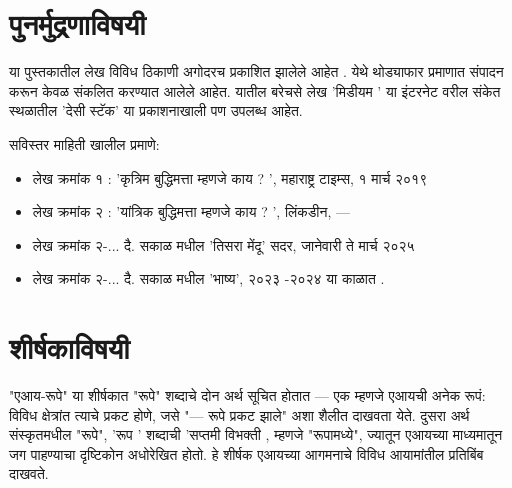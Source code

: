\chapter*{पुनर्मुद्रणाविषयी}

या पुस्तकातील लेख विविध ठिकाणी अगोदरच प्रकाशित झालेले आहेत .  येथे थोड्याफार प्रमाणात संपादन करून केवळ संकलित करण्यात आलेले आहेत.  यातील बरेचसे लेख 'मिडीयम '  या इंटरनेट वरील संकेत स्थळातील 'देसी स्टॅक' या प्रकाशनाखाली पण उपलब्ध आहेत. 

सविस्तर माहिती खालील प्रमाणे:
\begin{itemize}
	\item लेख क्रमांक १ : 'कृत्रिम बुद्धिमत्ता म्हणजे काय ? ', महाराष्ट्र टाइम्स, १  मार्च २०१९
	\item  लेख क्रमांक २  : 'यांत्रिक बुद्धिमत्ता म्हणजे काय ? ', लिंकडीन, --- 
	\item  लेख क्रमांक २-...  दै. सकाळ मधील 'तिसरा मेंदू' सदर, जानेवारी ते मार्च २०२५
	\item  लेख क्रमांक २-... दै. सकाळ मधील 'भाष्य', २०२३ -२०२४  या काळात . 
\end{itemize}



\chapter*{शीर्षकाविषयी }

"एआय-रूपे" या शीर्षकात "रूपे" शब्दाचे दोन अर्थ सूचित होतात — एक म्हणजे एआयची अनेक रूपं: विविध क्षेत्रांत त्याचे प्रकट होणे, जसे "--- रूपे प्रकट झाले" अशा शैलीत दाखवता येते. दुसरा अर्थ संस्कृतमधील "रूपे", 'रूप '  शब्दाची 'सप्तमी विभक्ती , म्हणजे "रूपामध्ये", ज्यातून एआयच्या माध्यमातून जग पाहण्याचा दृष्टिकोन अधोरेखित होतो. हे शीर्षक एआयच्या आगमनाचे विविध आयामांतील प्रतिबिंब दाखवते.